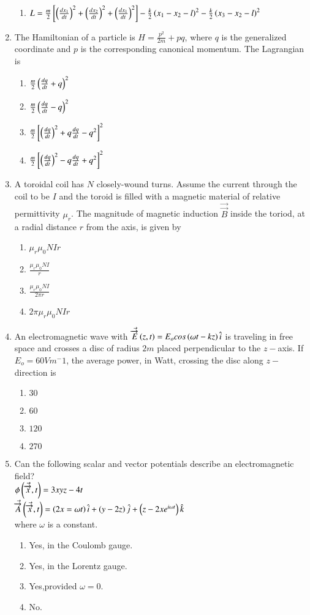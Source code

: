 \documentclass[journal]{IEEEtran}
\begin{document}
\begin{enumerate}
\begin{enumerate}
       \item $L = \frac{m}{2}{}\left[\left(\frac{dx_1}{dt}\right)^2 +\left(\frac{dx_2}{dt}\right)^2 +\left(\frac{dx_1}{dt}\right)^2\right]-\frac{k}{2}\left(x_1-x_2-l\right)^2 - \frac{k}{2}\left(x_3 - x_2 - l\right)^2$
\end{enumerate}
\item The Hamiltonian of a particle is $H = \frac{p^2}{2m} + pq$, where $q$ is the generalized coordinate and $p$ is the corresponding canonical momentum. The Lagrangian is 
\begin{enumerate}
    \item $\frac{m}{2}\left(\frac{dq}{dt} + q\right)^2$
    \item $\frac{m}{2}\left(\frac{dq}{dt} - q\right)^2$
    \item $\frac{m}{2}{}\left[\left(\frac{dq}{dt}\right)^2 + q\frac{dq}{dt}-q^2\right]^2$
    \item $\frac{m}{2}{}\left[\left(\frac{dq}{dt}\right)^2 - q\frac{dq}{dt}+q^2\right]^2$
\end{enumerate}
\item A toroidal coil has $N$ closely-wound turns. Assume the current through the coil to be $I$ and the toroid is filled with a magnetic material of relative permittivity $\mu_r$. The magnitude of magnetic induction $\Vec{\overrightarrow{B}}$ inside the toriod, at a radial distance $r$ from the axis, is given by 
\begin{enumerate}
    \item $\mu_r\mu_0NIr$
    \item $\frac{\mu_r\mu_0NI}{r}$
    \item $\frac{\mu_r\mu_0NI}{2\pi r}$
    \item $2\pi\mu_r\mu_0NIr$
\end{enumerate}
\item An electromagnetic wave with $\Vec{\overrightarrow{E
}}\left(z,t\right) = E_ocos\left(\omega t-kz\right)\hat{i}$ is traveling in free space and crosses a disc of radius $2 m$ placed perpendicular to the $z-$axis. If $E_o = 60 V m^-1$, the average power, in Watt, crossing the disc along $z-$direction is 
\begin{enumerate}
    \item $30$
    \item $60$
    \item $120$
    \item $270$
\end{enumerate}
\item Can the following scalar and vector potentials describe an electromagnetic field? \\
$\phi\left(\Vec{\overrightarrow{x}},t\right)=3xyz-4t$\\
$\Vec{\overrightarrow{A}}\left(\Vec{\overrightarrow{x}},t\right)= \left(2x=\omega t\right)\hat{i}+\left(y-2z\right)\hat{j}+\left(z-2xe^{i\omega t}\right)\hat{k}$\\
where $\omega$ is a constant.
\begin{enumerate}
    \item Yes, in the Coulomb gauge.
    \item Yes, in the Lorentz gauge.
    \item Yes,provided $\omega = 0$.
    \item No.
    

\end{enumerate}
\end{enumerate}
\end{document}
